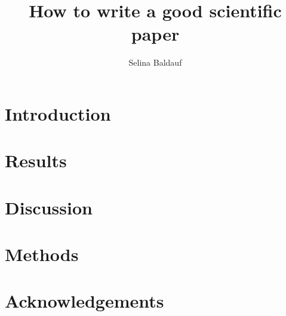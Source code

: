 \documentclass[fleqn,10pt]{wlscirep}
\title{How to write a good scientific paper}
\author[1,*]{Selina Baldauf}
\affil[1]{FU Berlin}
\begin{document}
\flushbottom
\maketitle

\thispagestyle{empty}



\section*{Introduction}



\section*{Results}




\section*{Discussion}


\section*{Methods}




\section*{Acknowledgements}
\end{document}
